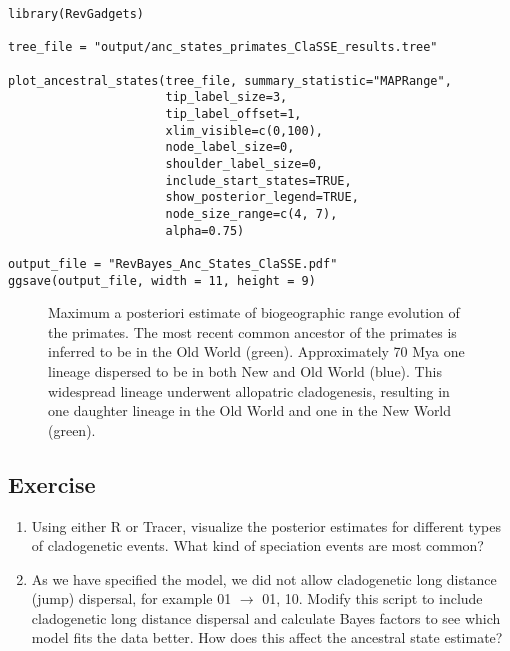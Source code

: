{\tt \begin{snugshade*}
\begin{lstlisting}
library(RevGadgets)

tree_file = "output/anc_states_primates_ClaSSE_results.tree"

plot_ancestral_states(tree_file, summary_statistic="MAPRange",
                      tip_label_size=3,
                      tip_label_offset=1,
                      xlim_visible=c(0,100),
                      node_label_size=0,
                      shoulder_label_size=0,
                      include_start_states=TRUE,
                      show_posterior_legend=TRUE,
                      node_size_range=c(4, 7),
                      alpha=0.75)

output_file = "RevBayes_Anc_States_ClaSSE.pdf"
ggsave(output_file, width = 11, height = 9)
\end{lstlisting}
\end{snugshade*}}

\begin{figure}[h!]
\centering
{}
\caption{\small Maximum a posteriori estimate of biogeographic range evolution of the primates. 
    The most recent common ancestor of the primates is inferred to be in the Old World (green).
    Approximately 70 Mya one lineage dispersed to be in both New and Old World (blue).
    This widespread lineage underwent allopatric cladogenesis, resulting in one
    daughter lineage in the Old World and one in the New World (green).}
\label{fig:results_ClaSSE}
\end{figure}

\subsection{Exercise}

\begin{enumerate}
\item Using either R or Tracer, visualize the posterior estimates for different types of cladogenetic events. 
    What kind of speciation events are most common?
\item As we have specified the model, we did not allow cladogenetic long
    distance (jump) dispersal, for example 01 $\rightarrow$ 01, 10.
    Modify this script to include cladogenetic 
    long distance dispersal and calculate Bayes factors to see which model fits the data better.
    How does this affect the ancestral state estimate?
\end{enumerate}

\newpage


